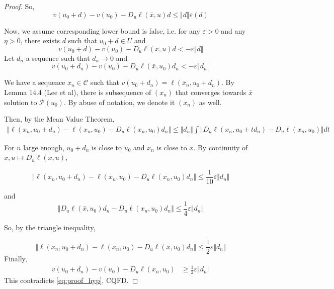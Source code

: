 \begin{proof}
   So,
   \begin{equation}
       v(u_0+d) - v(u_0) - D_u\ell(\bar x, u)d \leq \Vert d\Vert \varepsilon(d)
   \end{equation}

    Now, we assume corresponding lower bound is false, i.e. for any $\varepsilon>0$ and any $\eta >0$, there exists $d$ such that $u_0 + d\in U$ and
   \begin{equation}
       v(u_0+d) - v(u_0) - D_u\ell(\bar x, u)d < -\varepsilon\Vert d\Vert
   \end{equation}
    Let $d_n$ a sequence such that $d_n \to 0$ and
   \begin{equation}\label{eq:proof_hyp}
       v(u_0+d_n) - v(u_0) - D_u\ell(\bar x, u_0)d_n < -\varepsilon\Vert d_n\Vert
   \end{equation}

   We have a sequence $x_n\in \mathcal C$ such that $v(u_0+ d_n) = \ell(\bar x_n, u_0 + d_n)$. By Lemma 14.4 (Lee et al), there is subsequence of $(x_n)$ that converges towards $\bar x$ solution to $\mathcal P(u_0)$. By abuse of notation, we denote it $(x_n)$ as well.

   Then, by the Mean Value Theorem,
   \begin{align}
       \Vert \ell(x_n, u_0 + d_n) - \ell(x_n, u_0) - D_u \ell(x_n, u_0)d_n\Vert \leq \Vert d_n\Vert \int \Vert D_u \ell(x_n, u_0 + td_n) - D_u \ell(x_n, u_0)\Vert dt
   \end{align}

   For $n$ large enough, $u_0 + d_n$ is close to $u_0$ and $x_n$ is close to $\bar x$. By continuity of $x, u \mapsto D_u\ell(x, u)$,

   \begin{equation}
       \Vert \ell(x_n, u_0 + d_n) - \ell(x_n, u_0) - D_u \ell(x_n, u_0)d_n\Vert \leq \frac{1}{10} \varepsilon \Vert d_n \Vert
   \end{equation}

    and
    \begin{equation}
        \Vert D_u \ell(\bar x, u_0)d_n - D_u \ell(x_n, u_0)d_n\Vert \leq \frac{1}{4}\varepsilon \Vert d_n \Vert
    \end{equation}

    So, by the triangle inequality,

    \begin{equation}
       \Vert \ell(x_n, u_0 + d_n) - \ell(x_n, u_0) - D_u \ell(\bar x, u_0)d_n\Vert \leq \frac{1}{2} \varepsilon \Vert d_n \Vert
    \end{equation}
    Finally,
    \begin{align}
        v(u_0 + d_n) - v(u_0) - D_u \ell(x_n, u_0)&\geq\frac{1}{2}\varepsilon\Vert d_n\Vert
    \end{align}
    This contradicts \cref{eq:proof_hyp}, CQFD.
\end{proof}

